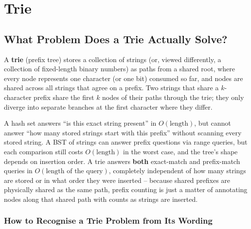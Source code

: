 \chapter{Trie}

\section{What Problem Does a Trie Actually Solve?}
\label{sec:trie-intro}

A \textbf{trie} (prefix tree) stores a collection of strings (or, viewed
differently, a collection of fixed-length binary numbers) as paths from a
shared root, where every node represents one character (or one bit)
consumed so far, and nodes are shared across all strings that agree on a
prefix. Two strings that share a $k$-character prefix share the first $k$
nodes of their paths through the trie; they only diverge into separate
branches at the first character where they differ.

\begin{ideabox}
A hash set answers ``is this exact string present'' in $O(\text{length})$,
but cannot answer ``how many stored strings start with this prefix''
without scanning every stored string. A BST of strings can answer prefix
questions via range queries, but each comparison still costs
$O(\text{length})$ in the worst case, and the tree's shape depends on
insertion order. A trie answers \textbf{both} exact-match and
prefix-match queries in $O(\text{length of the query})$, completely
independent of how many strings are stored or in what order they were
inserted -- because shared prefixes are physically shared as the same
path, prefix counting is just a matter of annotating nodes along that
shared path with counts as strings are inserted.
\end{ideabox}

\subsection*{How to Recognise a Trie Problem from Its Wording}

